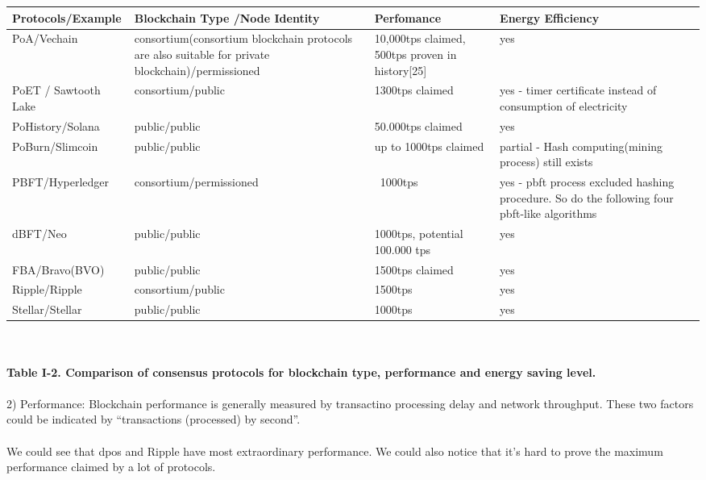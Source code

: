 \documentclass[doublespacing]{bmcart}
\begin{document}
\begin{CJK*}{UTF8}{gbsn}
\begin{tabular}{p{2cm}p{3cm}p{3cm}p{3cm}}
\hline
Protocols/E\-xample & Blockchain Type \newline /Node Identity & Perfo\-mance & Energy Efficiency \\ \hline
PoA/Vechain & consortium\newline(consortium blockchain protocols are also suitable for private blockchain)/permi\-ssioned & 10,000tps claimed, 500tps proven in history[25] & yes \\ \hline
PoET / Sawtooth Lake & consortium/public & 1300tps claimed & yes - timer certificate instead of consumption of electricity  \\ \hline
PoHistory/\newline Solana & public/public & 50.000tps claimed  & yes \\ \hline
PoBurn/\newline Slimcoin & public/public & up \newline to 1000tps claimed & partial - Hash computing(mining process) still exists  \\ \hline
PBFT/Hyp\-erledger & consortium/permi\-ssioned & ~1000tps & yes - pbft process excluded hashing procedure. So do the following four pbft-like algorithms  \\ \hline
dBFT/Neo & public/public & 1000tps, potential 100.000 tps & yes  \\ \hline
FBA/Bravo\newline(BVO) & public/public & 1500tps claimed & yes  \\ \hline
Ripple/Ripple & consortium/public & 1500tps & yes \\ \hline
Stellar/Stellar & public/public & 1000tps & yes \\ \hline
\end{tabular}\\
\paragraph{Table I-2. Comparison of consensus protocols for blockchain type, performance and energy saving level.}

\paragraph{}
2) Performance: Blockchain performance is generally measured by transactino processing delay and network throughput. These two factors could be indicated by ``transactions (processed) by second''. 
\paragraph{}
We could see that dpos and Ripple have most extraordinary performance. We could also notice that it's hard to prove the maximum performance claimed by a lot of protocols. 

\end{CJK*}
\end{document}
